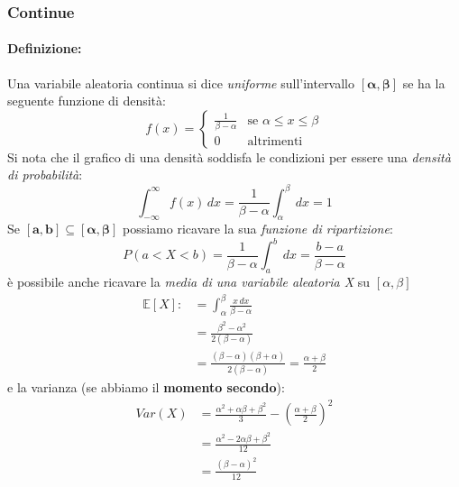 \documentclass[]{article}
\newcommand{\ev}{\mathbb{E}[X]}
\renewcommand{\ev}[1]{\mathbb{E}[#1]}
\newcommand{\definizione}{\paragraph{Definizione:}}
\begin{document}
    \subsubsection{Continue}
    \definizione Una variabile aleatoria continua si dice \textit{uniforme} sull'intervallo $\boldsymbol{[\alpha, \beta]}$ se ha la seguente funzione di densità:
    \begin{equation*}
        f(x) =
        \begin{cases}
            \frac{1}{\beta - \alpha} & \text{se } \alpha \leq x \leq \beta \\
            0 & \text{altrimenti}
        \end{cases}
    \end{equation*}
    Si nota che il grafico di una densità soddisfa le condizioni per essere una \textit{densità di probabilità}:
    \[ \int_{-\infty}^{\infty} f(x) \, dx = \frac{1}{\beta - \alpha} \int_{\alpha}^{\beta} \, dx = 1 \]
    Se $\boldsymbol{[a, b] \subseteq [\alpha, \beta]}$ possiamo ricavare la sua \textit{funzione di ripartizione}:
    \[ P(a < X < b) = \frac{1}{\beta - \alpha} \int_{a}^{b} \, dx = \frac{b - a}{\beta - \alpha}\]
    è possibile anche ricavare la \textit{media di una variabile aleatoria X} su $[\alpha, \beta]$
    \begin{equation*}
        \begin{split}
            \ev{X} :&= \int_{\alpha}^{\beta} \frac{x \,dx}{\beta - \alpha} \\
            & = \frac{\beta^2 - \alpha^2}{2(\beta - \alpha)} \\
            & = \frac{(\beta - \alpha) (\beta + \alpha)}{2(\beta - \alpha)} = \frac{\alpha + \beta}{2}
        \end{split}
    \end{equation*}
    e la varianza (se abbiamo il \textbf{momento secondo}):
    \begin{equation*}
        \begin{split}
            Var(X) &= \frac{\alpha^2 + \alpha \beta + \beta^2}{3} - (\frac{\alpha + \beta}{2})^2 \\
            & = \frac{\alpha^2 - 2\alpha \beta + \beta^2}{12} \\
            & = \frac{(\beta - \alpha)^2}{12}
        \end{split}
    \end{equation*}
\end{document}
